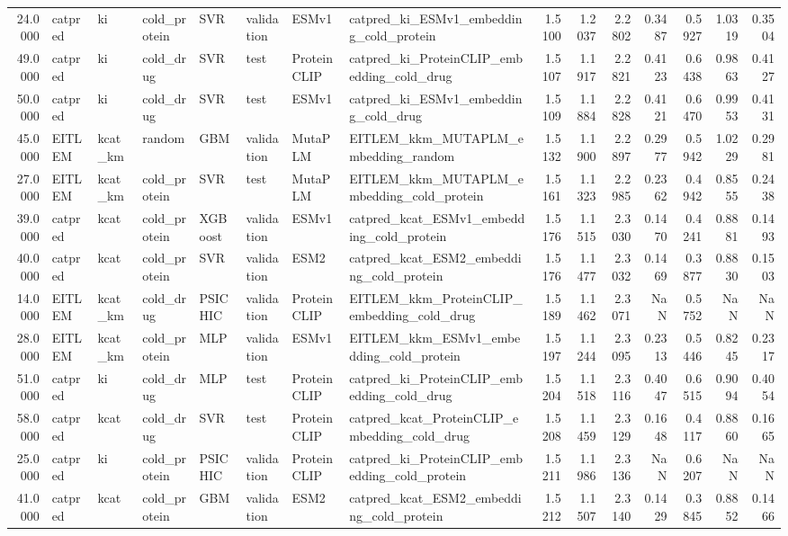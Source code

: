 \begin{tabular}{rlllllllrrrrrrr}
24.0000 & catpred & ki & cold_protein & SVR & validation & ESMv1 & catpred_ki_ESMv1_embedding_cold_protein & 1.5100 & 1.2037 & 2.2802 & 0.3487 & 0.5927 & 1.0319 & 0.3504 \\
49.0000 & catpred & ki & cold_drug & SVR & test & ProteinCLIP & catpred_ki_ProteinCLIP_embedding_cold_drug & 1.5107 & 1.1917 & 2.2821 & 0.4123 & 0.6438 & 0.9863 & 0.4127 \\
50.0000 & catpred & ki & cold_drug & SVR & test & ESMv1 & catpred_ki_ESMv1_embedding_cold_drug & 1.5109 & 1.1884 & 2.2828 & 0.4121 & 0.6470 & 0.9953 & 0.4131 \\
45.0000 & EITLEM & kcat_km & random & GBM & validation & MutaPLM & EITLEM_kkm_MUTAPLM_embedding_random & 1.5132 & 1.1900 & 2.2897 & 0.2977 & 0.5942 & 1.0229 & 0.2981 \\
27.0000 & EITLEM & kcat_km & cold_protein & SVR & test & MutaPLM & EITLEM_kkm_MUTAPLM_embedding_cold_protein & 1.5161 & 1.1323 & 2.2985 & 0.2362 & 0.4942 & 0.8555 & 0.2438 \\
39.0000 & catpred & kcat & cold_protein & XGBoost & validation & ESMv1 & catpred_kcat_ESMv1_embedding_cold_protein & 1.5176 & 1.1515 & 2.3030 & 0.1470 & 0.4241 & 0.8881 & 0.1493 \\
40.0000 & catpred & kcat & cold_protein & SVR & validation & ESM2 & catpred_kcat_ESM2_embedding_cold_protein & 1.5176 & 1.1477 & 2.3032 & 0.1469 & 0.3877 & 0.8830 & 0.1503 \\
14.0000 & EITLEM & kcat_km & cold_drug & PSICHIC & validation & ProteinCLIP & EITLEM_kkm_ProteinCLIP_embedding_cold_drug & 1.5189 & 1.1462 & 2.3071 & NaN & 0.5752 & NaN & NaN \\
28.0000 & EITLEM & kcat_km & cold_protein & MLP & validation & ESMv1 & EITLEM_kkm_ESMv1_embedding_cold_protein & 1.5197 & 1.1244 & 2.3095 & 0.2313 & 0.5446 & 0.8245 & 0.2317 \\
51.0000 & catpred & ki & cold_drug & MLP & test & ProteinCLIP & catpred_ki_ProteinCLIP_embedding_cold_drug & 1.5204 & 1.1518 & 2.3116 & 0.4047 & 0.6515 & 0.9094 & 0.4054 \\
58.0000 & catpred & kcat & cold_drug & SVR & test & ProteinCLIP & catpred_kcat_ProteinCLIP_embedding_cold_drug & 1.5208 & 1.1459 & 2.3129 & 0.1648 & 0.4117 & 0.8860 & 0.1665 \\
25.0000 & catpred & ki & cold_protein & PSICHIC & validation & ProteinCLIP & catpred_ki_ProteinCLIP_embedding_cold_protein & 1.5211 & 1.1986 & 2.3136 & NaN & 0.6207 & NaN & NaN \\
41.0000 & catpred & kcat & cold_protein & GBM & validation & ESM2 & catpred_kcat_ESM2_embedding_cold_protein & 1.5212 & 1.1507 & 2.3140 & 0.1429 & 0.3845 & 0.8852 & 0.1466 \\

\end{tabular}
